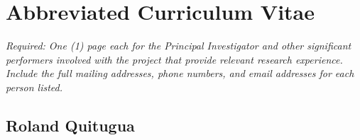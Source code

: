 \documentclass[11pt,english,letterpaper]{scrartcl}
\begin{document}
\clearpage

\appendix

\newpage

\section{Abbreviated Curriculum Vitae}

\textit{Required: One (1) page each for the Principal Investigator and other significant performers involved with the project that provide relevant research experience. Include the full mailing addresses, phone numbers, and email addresses for each person listed.}

\subsection{Roland Quitugua}
\end{document}
